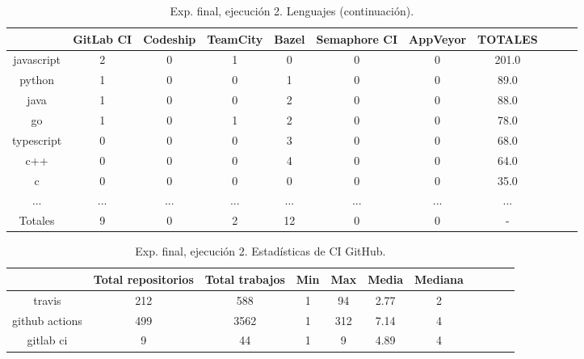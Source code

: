 \begin{table}
  \centering
  \caption{Exp. final, ejecución 2. Lenguajes (continuación).}
  \label{tab:tabla_f2_2b}

\begin{footnotesize}
\renewcommand{\arraystretch}{1.5} %
\begin{tabular}{ccccccccccc}
  \hline
  {} &  GitLab CI &  Codeship &  TeamCity &  Bazel &  Semaphore CI &  AppVeyor &  TOTALES \\
  \hline
  javascript    &        2 &         0 &         1 &      0 &             0 &         0 &    201.0 \\
  python        &        1 &         0 &         0 &      1 &             0 &         0 &     89.0 \\
  java          &        1 &         0 &         0 &      2 &             0 &         0 &     88.0 \\
  go            &        1 &         0 &         1 &      2 &             0 &         0 &     78.0 \\
  typescript    &        0 &         0 &         0 &      3 &             0 &         0 &     68.0 \\
  c++           &        0 &         0 &         0 &      4 &             0 &         0 &     64.0 \\
  c             &        0 &         0 &         0 &      0 &             0 &         0 &     35.0 \\
  ...           &      ... &       ... &       ... &    ... &           ... &       ... &      ... \\
  \hline
  Totales       &        9 &         0 &         2 &     12 &             0 &         0 &        - \\
 \end{tabular}
\end{footnotesize}

\end{table}

\begin{table}
  \centering
  \caption{Exp. final, ejecución 2. Estadísticas de CI GitHub.}
  \label{tab:tabla_f2_3}

\begin{footnotesize}
\renewcommand{\arraystretch}{1.5} %
\begin{tabular}{ccccccccccc}
  \hline
  {} &  Total repositorios &  Total trabajos &  Min &  Max &  Media &  Mediana \\
  \hline
  travis         &        212 &         588 &    1 &   94 &   2.77 &        2 \\
  github actions &        499 &        3562 &    1 &  312 &   7.14 &        4 \\
  gitlab ci      &          9 &          44 &    1 &    9 &   4.89 &        4 \\
 \end{tabular}
\end{footnotesize}

\end{table}

